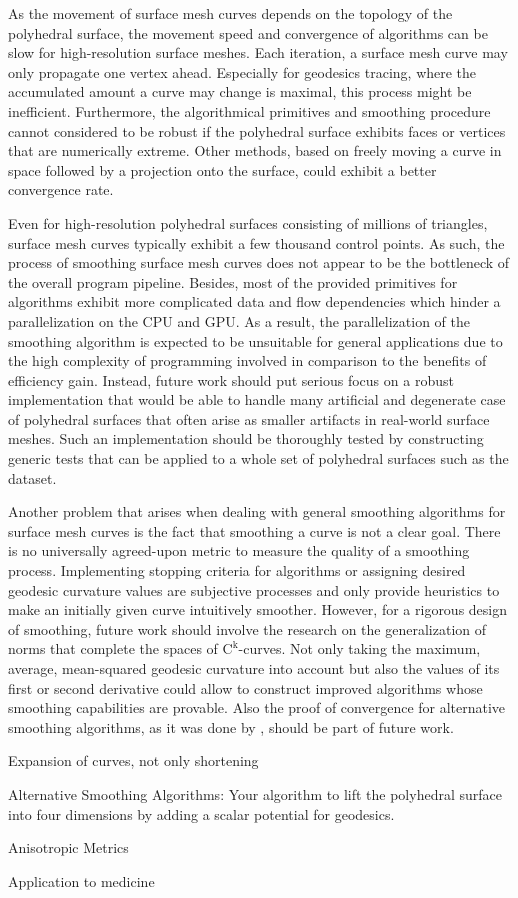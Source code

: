 \documentclass[crop=false]{stdlocal}
\begin{document}
  As the movement of surface mesh curves depends on the topology of the polyhedral surface, the movement speed and convergence of algorithms can be slow for high-resolution surface meshes.
  Each iteration, a surface mesh curve may only propagate one vertex ahead.
  Especially for geodesics tracing, where the accumulated amount a curve may change is maximal, this process might be inefficient.
  Furthermore, the algorithmical primitives and smoothing procedure cannot considered to be robust if the polyhedral surface exhibits faces or vertices that are numerically extreme.
  Other methods, based on freely moving a curve in space followed by a projection onto the surface, could exhibit a better convergence rate.

  Even for high-resolution polyhedral surfaces consisting of millions of triangles, surface mesh curves typically exhibit a few thousand control points.
  As such, the process of smoothing surface mesh curves does not appear to be the bottleneck of the overall program pipeline.
  Besides, most of the provided primitives for algorithms exhibit more complicated data and flow dependencies which hinder a parallelization on the CPU and GPU.
  As a result, the parallelization of the smoothing algorithm is expected to be unsuitable for general applications due to the high complexity of programming involved in comparison to the benefits of efficiency gain.
  Instead, future work should put serious focus on a robust implementation that would be able to handle many artificial and degenerate case of polyhedral surfaces that often arise as smaller artifacts in real-world surface meshes.
  Such an implementation should be thoroughly tested by constructing generic tests that can be applied to a whole set of polyhedral surfaces such as the  dataset.

  Another problem that arises when dealing with general smoothing algorithms for surface mesh curves is the fact that smoothing a curve is not a clear goal.
  There is no universally agreed-upon metric to measure the quality of a smoothing process.
  Implementing stopping criteria for algorithms or assigning desired geodesic curvature values are subjective processes and only provide heuristics to make an initially given curve intuitively smoother.
  However, for a rigorous design of smoothing, future work should involve the research on the generalization of norms that complete the spaces of $\mathrm{C^k}$-curves.
  Not only taking the maximum, average, mean-squared geodesic curvature into account but also the values of its first or second derivative could allow to construct improved algorithms whose smoothing capabilities are provable.
  Also the proof of convergence for alternative smoothing algorithms, as it was done by \textcite{lawonn2014}, should be part of future work.

  Expansion of curves, not only shortening

  Alternative Smoothing Algorithms: Your algorithm to lift the polyhedral surface into four dimensions by adding a scalar potential for geodesics.

  Anisotropic Metrics

  Application to medicine

\end{document}
